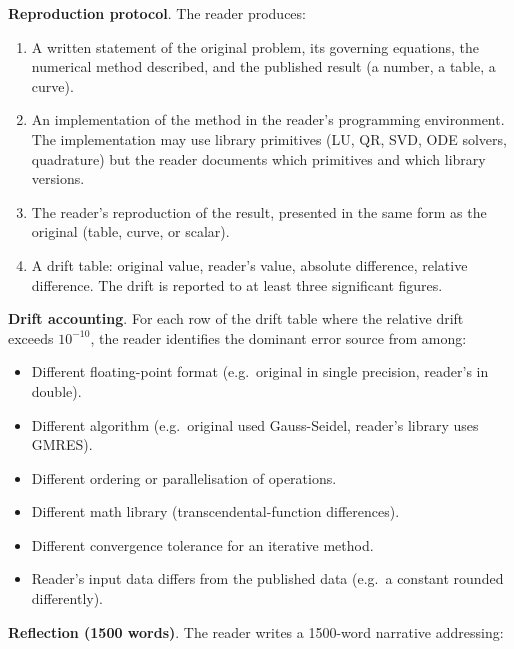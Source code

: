 \begin{project}
\textbf{Reproduction protocol}. The reader produces:

\begin{enumerate}[leftmargin=*]
  \item A written statement of the original problem, its
    governing equations, the numerical method described, and the
    published result (a number, a table, a curve).
  \item An implementation of the method in the reader's
    programming environment. The implementation may use library
    primitives (LU, QR, SVD, ODE solvers, quadrature) but the
    reader documents which primitives and which library versions.
  \item The reader's reproduction of the result, presented in
    the same form as the original (table, curve, or scalar).
  \item A drift table: original value, reader's value, absolute
    difference, relative difference. The drift is reported to at
    least three significant figures.
\end{enumerate}

\textbf{Drift accounting}. For each row of the drift table where
the relative drift exceeds $10^{-10}$, the reader identifies the
dominant error source from among:

\begin{itemize}[leftmargin=*]
  \item Different floating-point format (e.g.\ original in single
    precision, reader's in double).
  \item Different algorithm (e.g.\ original used Gauss-Seidel,
    reader's library uses GMRES).
  \item Different ordering or parallelisation of operations.
  \item Different math library (transcendental-function
    differences).
  \item Different convergence tolerance for an iterative method.
  \item Reader's input data differs from the published data
    (e.g.\ a constant rounded differently).
\end{itemize}

\textbf{Reflection (1500 words)}. The reader writes a 1500-word
narrative addressing:


\end{project}
